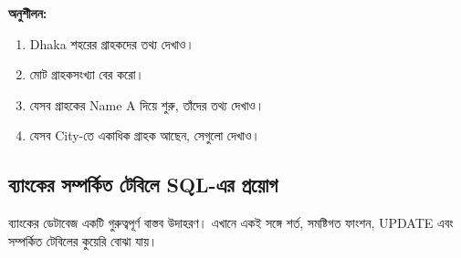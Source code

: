 \textbf{অনুশীলন:}\begin{enumerate}
\item Dhaka শহরের গ্রাহকদের তথ্য দেখাও।
\item মোট গ্রাহকসংখ্যা বের করো।
\item যেসব গ্রাহকের Name A দিয়ে শুরু, তাঁদের তথ্য দেখাও।
\item যেসব City-তে একাধিক গ্রাহক আছেন, সেগুলো দেখাও।
\end{enumerate}
\subsection{ব্যাংকের সম্পর্কিত টেবিলে SQL-এর প্রয়োগ}

ব্যাংকের ডেটাবেজ একটি গুরুত্বপূর্ণ বাস্তব উদাহরণ। এখানে একই সঙ্গে
শর্ত, সমষ্টিগত ফাংশন, UPDATE এবং সম্পর্কিত টেবিলের কুয়েরি
বোঝা যায়।


